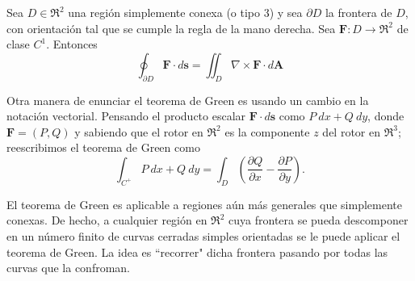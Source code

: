 \begin{theorem}
    Sea $D\in\Re^2$ una regi\'on simplemente conexa (o tipo 3) y sea $\partial D$ la frontera de $D$, con orientaci\'on tal que se cumple la regla de la mano derecha. Sea $\mathbf{F}:D\to\Re^2$ de clase $C^1$. Entonces
    \[
        \oint_{\partial D}\mathbf{F}\cdot d\mathbf{s} = \iint_D \nabla\times\mathbf{F}\cdot d\mathbf{A}
    \]
\end{theorem}

Otra manera de enunciar el teorema de Green es usando un cambio en la notaci\'on vectorial. Pensando el producto escalar $\mathbf{F}\cdot d\mathbf{s}$ como $P\:dx+Q\:dy$, donde $\mathbf{F}=(P,Q)$ y sabiendo que el rotor en $\Re^2$ es la componente $z$ del rotor en $\Re^3$; reescribimos el teorema de Green como
\[
        \int_{C^+}P\:dx+Q\:dy=\int_D\left(\frac{\partial Q}{\partial x}-\frac{\partial P}{\partial y}\right).
\]

El teorema de Green es aplicable a regiones a\'un m\'as generales que simplemente conexas. De hecho, a cualquier regi\'on en $\Re^2$ cuya frontera se pueda descomponer en un n\'umero finito de curvas cerradas simples orientadas se le puede aplicar el teorema de Green. La idea es ``recorrer" dicha frontera pasando por todas las curvas que la confroman.

